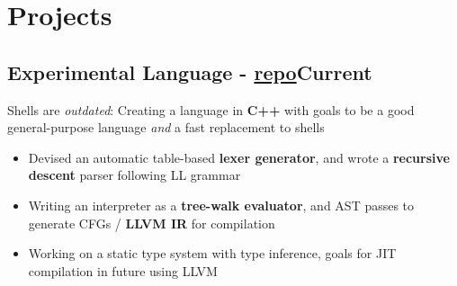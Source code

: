 \documentclass[9pt]{article}
\begin{document}
\section*{Projects}

\subsection{Experimental Language \normalsize\textnormal{- \href{https://github.com/ianayl/compiler}{repo}}\hfill \normalsize\textnormal{Current}}
Shells are \textit{outdated}: Creating a language in \textbf{C++} with goals to be a good general-purpose language \textit{and} a fast replacement to shells
\vspace{-0.5em}
\begin{itemize}
  \item Devised an automatic table-based \textbf{lexer generator}, and wrote a \textbf{recursive descent} parser following LL grammar
  \item Writing an interpreter as a \textbf{tree-walk evaluator}, and AST passes to generate CFGs / \textbf{LLVM IR} for compilation
  \item Working on a static type system with type inference, goals for JIT compilation in future using LLVM
\end{itemize}

\end{document}
